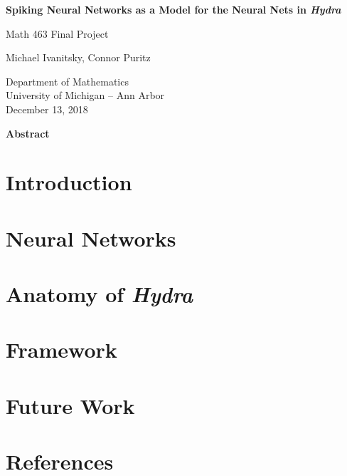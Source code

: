 \documentclass{article}
\begin{document}
\begin{titlepage}
   \begin{center}
       \vspace*{1cm}
       \LARGE
       \textbf{Spiking Neural Networks as a Model for the Neural Nets in \textit{Hydra}}
       \vspace{0.5cm}
       
       \Large
       Math 463 Final Project
       
       \vspace{1.5cm}
       \LARGE
       Michael Ivanitsky, Connor Puritz
 
       \vfill
 
       \large
       Department of Mathematics\\
       University of Michigan – Ann Arbor\\
       December 13, 2018
       \vspace{1cm}
   \end{center}
\end{titlepage}

\Large
\textbf{Abstract}
\newpage

\section{Introduction}
\newpage

\section{Neural Networks}
\newpage

\section{Anatomy of \textit{Hydra}}
\newpage

\section{Framework}
\newpage

\section{Future Work}
\newpage

\section{References}
\end{document}

